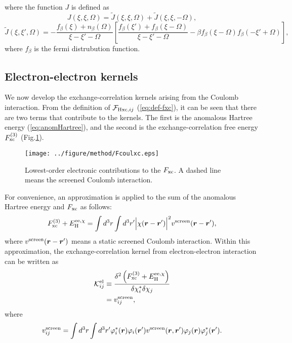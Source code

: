 %
where the function $J$ is defined as
%
\begin{equation}
	J(\xi, \xi, \Omega) = \tilde{J}(\xi, \xi, \Omega) + \tilde{J}(\xi, \xi, -\Omega), 
	\label{eq:Jfunc}
\end{equation}
%
\begin{equation}
	\tilde{J}(\xi, \xi', \Omega) = 
	- \frac{f_\beta(\xi) + n_\beta(\Omega)}{\xi-\xi'-\Omega}
	\left[
		\frac{f_\beta(\xi') + f_\beta(\xi-\Omega)}{\xi-\xi'-\Omega} -
		\beta f_\beta(\xi-\Omega) f_\beta(-\xi'+\Omega)
	\right],
	\label{eq:Jtildefunc}
\end{equation}
%
where $f_{\beta}$ is the fermi distrubution function.
%
%
\subsection*{Electron-electron kernels}
%
We now develop the exchange-correlation kernels arising from the Coulomb interaction.
From the definition of ${\mathcal F}_{{\rm Hxc},ij}$ (\ref{eq:def-fxc}), it can be seen that
there are two terms that contribute to the kernels. The first is the anomalous Hartree energy (\ref{eq:anomHartree}), 
and the second is the exchange-correlation free energy $F^{(3)}_{\rm xc}$ (Fig.\ref{fig:Fcoulxc}).
%
\begin{figure} %
	\centering
	\texttt{[image: ../figure/method/Fcoulxc.eps]}
	\caption{Lowest-order electronic contributions to the $F_{\rm xc}$. A dashed line means the screened Coulomb interaction.}
	\label{fig:Fcoulxc}
\end{figure}
%
For convenience, an approximation is applied to the sum of the anomalous Hartree energy and $F_{\rm xc}$ 
as follows\cite{Luders2005_1}:
%
\begin{equation}
	F^{(3)}_{\rm xc} + E^{{\rm ee}, \chi}_{\rm H} = \int d^3r \int d^3r'
	\Big| \chi(\bm r - \bm r') \Big|^2 v^{\rm screen}(\bm r - \bm r'),
	\label{Fcoulxcapprox}
\end{equation}
%
where $v^{\rm screen}(\bm r - \bm r')$ means a static screened Coulomb interaction.
Within this approximation, the exchange-correlation kernel from electron-electron interaction
can be written as
%
\begin{equation}
	\label{eq:Kel}
\begin{split}
	{\mathcal K}^{\rm el}_{ij} &\equiv \frac{\delta^2 \left( F^{(3)}_{\rm xc} + E^{{\rm ee},\chi}_{\rm H} \right)}
	{\delta \chi^\ast_i \delta\chi_j} \\
	& = v^{\rm screen}_{ij},
\end{split}
\end{equation}
%
where
%
\begin{equation}
	v^{\rm screen}_{ij} = \int d^3r \int d^3r' \varphi^\ast_i(\bm r)\varphi_i({\bm r'})
	v^{\rm screen}(\bm r, {\bm r'}) \varphi_j(\bm r) \varphi^\ast_j({\bm r'}).
	\label{eq:Keldef}
\end{equation}
%

